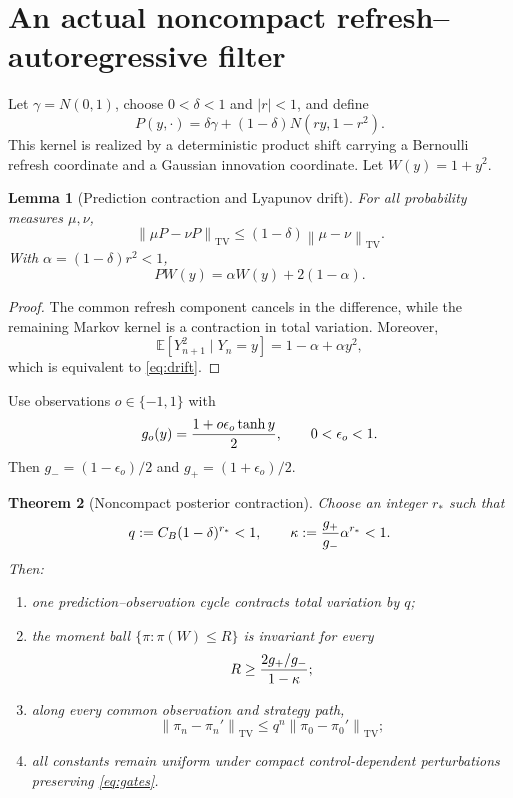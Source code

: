 \documentclass[11pt,reqno]{amsart}
\newtheorem{theorem}{Theorem}[section]
\newtheorem{lemma}[theorem]{Lemma}
\theoremstyle{definition}
\theoremstyle{remark}
\newcommand{\E}{\mathbb E}
\newcommand{\TV}{\mathrm{TV}}
\newcommand{\norm}[1]{\left\lVert #1\right\rVert}
\newcommand{\abs}[1]{\left\lvert #1\right\rvert}
\begin{document}
\section{An actual noncompact refresh--autoregressive filter}

Let $\gamma=N(0,1)$, choose $0<\delta<1$ and $\abs r<1$, and define
\begin{equation}\label{eq:kernel}
 P(y,\cdot)=\delta\gamma+(1-\delta)N(ry,1-r^2).
\end{equation}
This kernel is realized by a deterministic product shift carrying a Bernoulli
refresh coordinate and a Gaussian innovation coordinate.  Let
$W(y)=1+y^2$.

\begin{lemma}[Prediction contraction and Lyapunov drift]\label{lem:refresh}
For all probability measures $\mu,\nu$,
\begin{equation}\label{eq:TV-contract}
 \norm{\mu P-\nu P}_{\TV}
 \le(1-\delta)\norm{\mu-\nu}_{\TV}.
\end{equation}
With $\alpha=(1-\delta)r^2<1$,
\begin{equation}\label{eq:drift}
 PW(y)=\alpha W(y)+2(1-\alpha).
\end{equation}
\end{lemma}

\begin{proof}
The common refresh component cancels in the difference, while the remaining
Markov kernel is a contraction in total variation.  Moreover,
\[
 \E[Y_{n+1}^2\mid Y_n=y]
 =1-\alpha+\alpha y^2,
\]
which is equivalent to \eqref{eq:drift}.
\end{proof}

Use observations $o\in\{-1,1\}$ with
\begin{equation}\label{eq:likelihood}
 g_o(y)={1+o\epsilon_o\tanh y\over2},
 \qquad0<\epsilon_o<1.
\end{equation}
Then
$g_-=(1-\epsilon_o)/2$ and $g_+=(1+\epsilon_o)/2$.

\begin{theorem}[Noncompact posterior contraction]\label{thm:filter}
Choose an integer $r_*$ such that
\begin{equation}\label{eq:gates}
 q:=C_B(1-\delta)^{r_*}<1,
 \qquad
 \kappa:={g_+\over g_-}\alpha^{r_*}<1.
\end{equation}
Then:
\begin{enumerate}[label=(\roman*)]
\item one prediction--observation cycle contracts total variation by $q$;
\item the moment ball $\{\pi:\pi(W)\le R\}$ is invariant for every
\[
 R\ge {2g_+/g_-\over1-\kappa};
\]
\item along every common observation and strategy path,
\[
 \norm{\pi_n-\pi_n'}_{\TV}
 \le q^n\norm{\pi_0-\pi_0'}_{\TV};
\]
\item all constants remain uniform under compact control-dependent
perturbations preserving \eqref{eq:gates}.
\end{enumerate}
\end{theorem}
\end{document}
